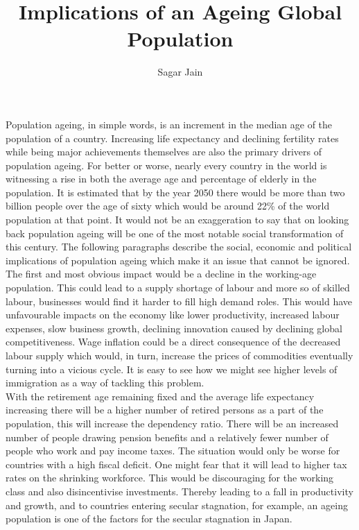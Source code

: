 \documentclass[12pt]{article}
\begin{document}
\title{Implications of an Ageing Global Population}
\author{Sagar Jain}
\date{}
\maketitle
Population ageing, in simple words, is an increment in the median age of the population of a country. Increasing life expectancy and declining fertility rates while being major achievements themselves are also the primary drivers of population ageing. For better or worse, nearly every country in the world is witnessing a rise in both the average age and percentage of elderly in the population. It is estimated that by the year 2050 there would be more than two billion people over the age of sixty which would be around 22\% of the world population at that point. It would not be an exaggeration to say that on looking back population ageing will be one of the most notable social transformation of this century. The following paragraphs describe the social, economic and political implications of population ageing which make it an issue that cannot be ignored.\\
The first and most obvious impact would be a decline in the working-age population. This could lead to a supply shortage of labour and more so of skilled labour, businesses would find it harder to fill high demand roles. This would have unfavourable impacts on the economy like lower productivity, increased labour expenses, slow business growth, declining innovation caused by declining global competitiveness. Wage inflation could be a direct consequence of the decreased labour supply which would, in turn, increase the prices of commodities eventually turning into a vicious cycle. It is easy to see how we might see higher levels of immigration as a way of tackling this problem.\\
With the retirement age remaining fixed and the average life expectancy increasing there will be a higher number of retired persons as a part of the population, this will increase the dependency ratio. There will be an increased number of people drawing pension benefits and a relatively fewer number of people who work and pay income taxes. The situation would only be worse for countries with a high fiscal deficit. One might fear that it will lead to higher tax rates on the shrinking workforce. This would be discouraging for the working class and also disincentivise investments. Thereby leading to a fall in productivity and growth, and to countries entering secular stagnation, for example, an ageing population is one of the factors for the secular stagnation in Japan.\\
\end{document}
